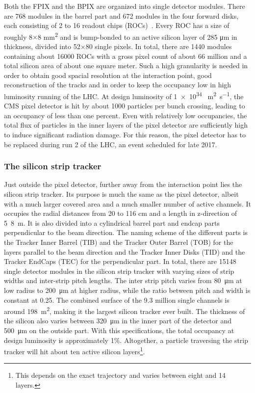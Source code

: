 Both the FPIX and the BPIX are organized into single detector modules. There are 768 modules in the barrel part and 672 modules in the four
forward disks, each consisting of 2 to 16 readout chips (ROCs)~\cite{bpix}. Every ROC has a size of roughly 8$\times$8 \si{\square\milli\meter} and is bump-bonded
to an active silicon layer of 285 \si{\micro\meter} in thickness, divided into 52$\times$80 single pixels. In total, there are  1440 modules containing
about \num{16000} ROCs with a gross pixel count of about 66 million and a total silicon area of about one square meter. 
Such a high granularity is needed in order to obtain good spacial resolution
at the interaction point, good reconstruction of the tracks and in order to keep the occupancy low in high luminosity running of the LHC. At design
luminosity of \num{1e34} \si{\per\square\meter\per\second}, the CMS pixel detector is hit by about \num{1000} particles per bunch crossing, leading
to an occupancy of less than one percent.
Even with relatively low occupancies, the total flux of particles in the inner layers of the pixel detector are sufficiently high to induce
significant radiation damage. For this reason, the pixel detector has to be replaced during run 2 of the LHC, an event scheduled for late 2017.

\subsubsection*{The silicon strip tracker}
Just outside the pixel detector, further away from the interaction point lies the silicon strip tracker. Its purpose is much the same as the
pixel detector, albeit with a much larger covered area and a much smaller number of active channels. It occupies the radial distances from
20 to 116 cm and a length in z-direction of \si{5.8 \meter}. It is also divided into a cylindrical barrel part and endcap parts perpendicular to the beam direction. The naming scheme of the 
different parts is the Tracker Inner Barrel (TIB) and the Tracker Outer Barrel (TOB) for the layers parallel to the beam direction and the
Tracker Inner Disks (TID) and the Tracker EndCaps (TEC) for the perpendicular part. In total, there are \num{15148} single detector modules
in the silicon strip tracker\cite{siliconstrip} with varying sizes of strip widths and inter-strip pitch lengths. The inter strip pitch varies
from \si{80 \micro\meter} at low radius to \si{200 \micro\meter} at higher radius, while the ratio between pitch and width is constant at \num{0.25}.
The combined surface of the 9.3 million single channels is around \si{198 \square\meter}, making it the largest silicon tracker ever built.
The thickness of the silicon also varies between \si{320 \micro\meter} in the inner part of the detector and \si{500 \micro\meter} on the outside part. With this specifications,
the total occupancy at design luminosity is approximately 1\%. Altogether, a particle traversing the strip tracker will
hit about ten active silicon layers\footnote{This depends on the exact trajectory and varies between eight and 14 layers.}.

